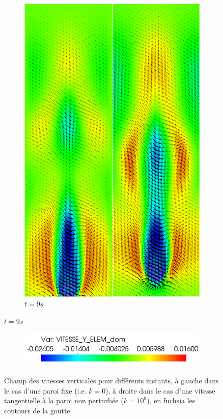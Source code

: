 \begin{figure}[H]
\begin{subfigure}[ht!]{0.3\textwidth}
		\includegraphics[width=1\textwidth]{compare_CL/t=9s.png}
		\caption{$t=9s$}
	\end{subfigure}
\end{figure}\vspace{-0.7cm}
\begin{figure}[H]
	\centering
	\ContinuedFloat
	\begin{subfigure}[ht!]{0.5\textwidth}
		\centering
		\includegraphics[width=1\textwidth]{compare_CL/colorbar.png}
	\end{subfigure}
	\caption{Champ des vitesses verticales pour différents instants, à gauche dans le cas d'une paroi fixe (i.e. $k=0$), à droite dans le cas d'une vitesse tangentielle à la paroi non perturbée ($k=10^{9}$), en fuchsia les contours de la goutte}
	\label{fig:champvitesse_knud}
\end{figure}





